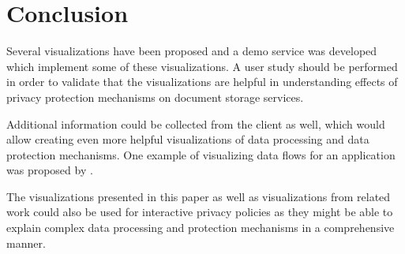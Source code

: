 \section{Conclusion}
Several visualizations have been proposed and a demo service was developed which implement some of these visualizations.
A user study should be performed in order to validate that the visualizations are helpful in understanding effects of privacy protection mechanisms on document storage services.

Additional information could be collected from the client as well, which would allow creating even more helpful visualizations of data processing and data protection mechanisms.
One example of visualizing data flows for an application was proposed by \textcite{DBLP:conf/nordsec/Kani-ZabihiH11}.

The visualizations presented in this paper as well as visualizations from related work could also be used for interactive privacy policies as they might be able to explain complex data processing and protection mechanisms in a comprehensive manner.
